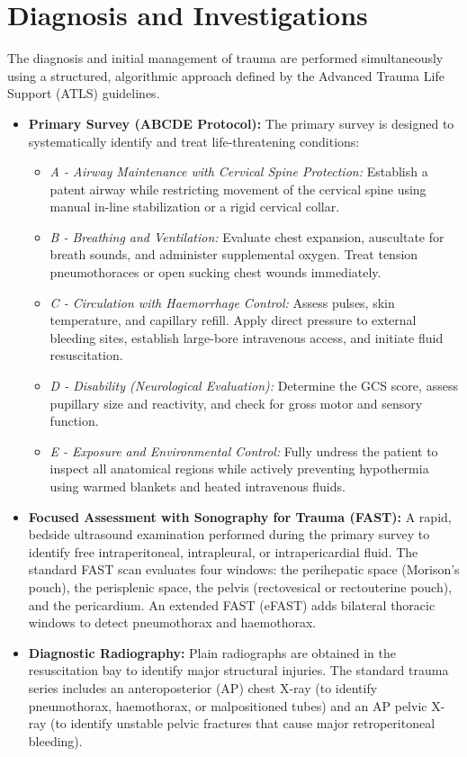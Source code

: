 \section*{Diagnosis and Investigations}
The diagnosis and initial management of trauma are performed simultaneously using a structured, algorithmic approach defined by the Advanced Trauma Life Support (ATLS) guidelines.
\begin{itemize}
    \item \textbf{Primary Survey (ABCDE Protocol):} The primary survey is designed to systematically identify and treat life-threatening conditions:
    \begin{itemize}
        \item \textit{A - Airway Maintenance with Cervical Spine Protection:} Establish a patent airway while restricting movement of the cervical spine using manual in-line stabilization or a rigid cervical collar.
        \item \textit{B - Breathing and Ventilation:} Evaluate chest expansion, auscultate for breath sounds, and administer supplemental oxygen. Treat tension pneumothoraces or open sucking chest wounds immediately.
        \item \textit{C - Circulation with Haemorrhage Control:} Assess pulses, skin temperature, and capillary refill. Apply direct pressure to external bleeding sites, establish large-bore intravenous access, and initiate fluid resuscitation.
        \item \textit{D - Disability (Neurological Evaluation):} Determine the GCS score, assess pupillary size and reactivity, and check for gross motor and sensory function.
        \item \textit{E - Exposure and Environmental Control:} Fully undress the patient to inspect all anatomical regions while actively preventing hypothermia using warmed blankets and heated intravenous fluids.
    \end{itemize}
    \item \textbf{Focused Assessment with Sonography for Trauma (FAST):} A rapid, bedside ultrasound examination performed during the primary survey to identify free intraperitoneal, intrapleural, or intrapericardial fluid. The standard FAST scan evaluates four windows: the perihepatic space (Morison's pouch), the perisplenic space, the pelvis (rectovesical or rectouterine pouch), and the pericardium. An extended FAST (eFAST) adds bilateral thoracic windows to detect pneumothorax and haemothorax.
    \item \textbf{Diagnostic Radiography:} Plain radiographs are obtained in the resuscitation bay to identify major structural injuries. The standard trauma series includes an anteroposterior (AP) chest X-ray (to identify pneumothorax, haemothorax, or malpositioned tubes) and an AP pelvic X-ray (to identify unstable pelvic fractures that cause major retroperitoneal bleeding).

\end{itemize}
